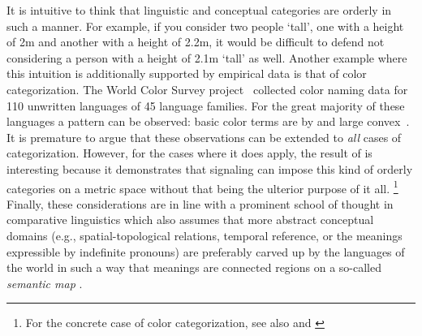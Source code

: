 \documentclass[fleqn,reqno,10pt]{article}
\begin{document}
It is intuitive to think that linguistic and conceptual categories are orderly in such a
manner.  For example, if you consider two people `tall', one with a height of 2m and another with a
height of 2.2m, it would be difficult to defend not considering a person with a height
of 2.1m `tall' as well. Another example where this intuition is additionally supported by empirical data is that of color categorization. The World Color Survey
project~\citep{CookKay2005:The-World-Color,WCS} collected color naming data for 110 unwritten
languages of 45 language families.  For the great majority of these languages a pattern can be
observed: basic color terms are by and large convex~\citep{Regier07,Jager2010}. It
is premature to argue that these observations can be extended to \emph{all} cases of
categorization. However, for the cases where it does apply, the result of
\citet{JagerMetzger2011:Voronoi-Languag} is interesting because it demonstrates that signaling
can impose this kind of orderly categories on a metric space without that being the ulterior
purpose of it all.%
\footnote{For the concrete case of color categorization, see also
  \citet{JagerRooijvan-Rooij2007:Language-Struct} and \citet{Correia2015}}
Finally, these considerations are in line with a prominent
school of thought in comparative linguistics which also assumes that more abstract conceptual domains
(e.g., spatial-topological relations, temporal reference, or the meanings expressible by
indefinite pronouns) are preferably carved up by the languages of the world in such a way
that meanings are connected regions on a so-called \emph{semantic map}
\citep[e.g.][]{Croft2003:Typology-and-Un,Haspelmath2003:The-geometry-of,LevinsonMeira2003:Natural-concept}.
\end{document}

